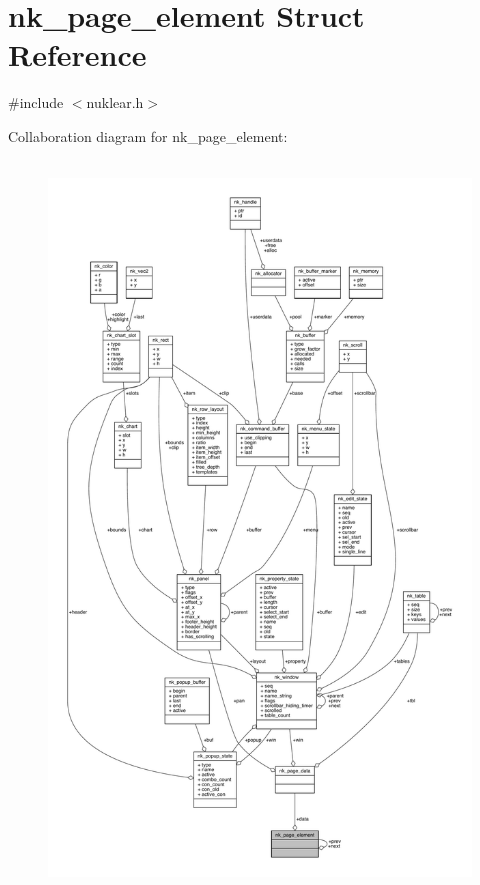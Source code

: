 \hypertarget{structnk__page__element}{}\section{nk\+\_\+page\+\_\+element Struct Reference}
\label{structnk__page__element}


{\ttfamily \#include $<$nuklear.\+h$>$}



Collaboration diagram for nk\+\_\+page\+\_\+element\+:
\nopagebreak
\begin{figure}[H]
\begin{center}
\leavevmode
\includegraphics[height=550pt]{structnk__page__element__coll__graph}
\end{center}
\end{figure}
